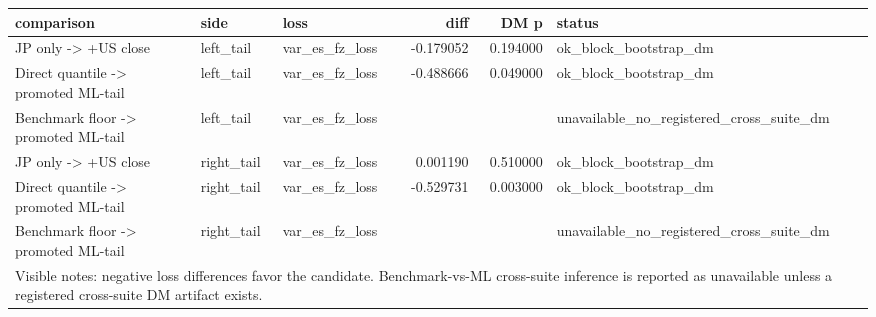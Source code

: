 \begin{tabular}{lllrrl}
\toprule
comparison & side & loss & diff & DM p & status \\
\midrule
JP only -> +US close & left\_tail & var\_es\_fz\_loss & -0.179052 & 0.194000 & ok\_block\_bootstrap\_dm \\
Direct quantile -> promoted ML-tail & left\_tail & var\_es\_fz\_loss & -0.488666 & 0.049000 & ok\_block\_bootstrap\_dm \\
Benchmark floor -> promoted ML-tail & left\_tail & var\_es\_fz\_loss &  &  & unavailable\_no\_registered\_cross\_suite\_dm \\
JP only -> +US close & right\_tail & var\_es\_fz\_loss & 0.001190 & 0.510000 & ok\_block\_bootstrap\_dm \\
Direct quantile -> promoted ML-tail & right\_tail & var\_es\_fz\_loss & -0.529731 & 0.003000 & ok\_block\_bootstrap\_dm \\
Benchmark floor -> promoted ML-tail & right\_tail & var\_es\_fz\_loss &  &  & unavailable\_no\_registered\_cross\_suite\_dm \\
\midrule
\multicolumn{6}{l}{\footnotesize Visible notes: negative loss differences favor the candidate. Benchmark-vs-ML cross-suite inference is reported as unavailable unless a registered cross-suite DM artifact exists.} \\
\bottomrule
\end{tabular}

